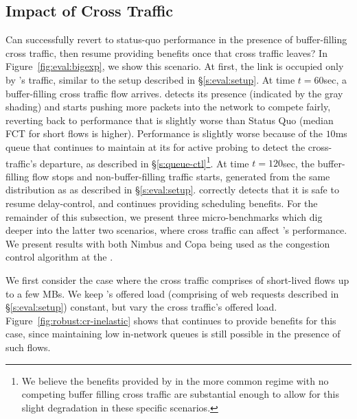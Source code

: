 \subsection{Impact of Cross Traffic}\label{s:robust:cross}



Can \name successfully revert to status-quo performance in the presence of buffer-filling cross traffic, then resume providing benefits once that cross traffic leaves?
In Figure~\ref{fig:eval:bigexp}, we show this scenario.
At first, the link is occupied only by \name's traffic, similar to the setup described in \S\ref{s:eval:setup}.
At time $t=60$sec, a buffer-filling cross traffic flow arrives.
\name detects its presence (indicated by the gray shading) and starts pushing more packets into the network to compete fairly, reverting back to performance that is slightly worse than Status Quo (median FCT for short flows is \bigexpElasticSlowdownWorseness higher). 
Performance is slightly worse because of the $10$ms queue that \name continues to maintain at its \inbox for active probing to detect the cross-traffic's departure, as described in \S\ref{s:queue-ctl}\footnote{We believe the benefits provided by \name in the more common regime with no competing buffer filling cross traffic are substantial enough to allow for this slight degradation in these specific scenarios.}.  
At time $t=120$sec, the buffer-filling flow stops and non-buffer-filling traffic starts, generated from the same distribution as \name as described in \S\ref{s:eval:setup}.
\name correctly detects that it is safe to resume delay-control, and continues providing scheduling benefits.
For the remainder of this subsection, we present three micro-benchmarks which dig deeper into the latter two scenarios, where cross traffic can affect \name's performance. 
We present results with both Nimbus and Copa being used as the congestion control algorithm at the \inbox.


 We first consider the case where the cross traffic comprises of short-lived flows up to a few MBs.
We keep \name's offered load (comprising of web requests described in \S\ref{s:eval:setup}) constant, but vary the cross traffic's offered load.
Figure~\ref{fig:robust:cr-inelastic} shows that \name continues to provide benefits for this case, since maintaining low in-network queues is still possible in the presence of such flows.

